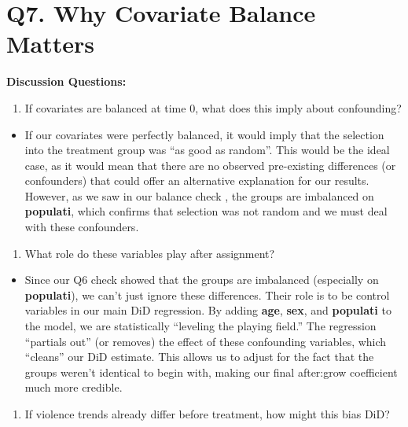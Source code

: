 \documentclass[
]{article}
\providecommand{\tightlist}{%
  \setlength{\itemsep}{0pt}\setlength{\parskip}{0pt}}
\begin{document}
\section{Q7. Why Covariate Balance
Matters}\label{q7.-why-covariate-balance-matters}

\textbf{Discussion Questions:}

\begin{enumerate}
\def\labelenumi{\arabic{enumi}.}
\tightlist
\item
  If covariates are balanced at time 0, what does this imply about
  confounding?
\end{enumerate}

\begin{itemize}
\tightlist
\item
  If our covariates were perfectly balanced, it would imply that the
  selection into the treatment group was ``as good as random''. This
  would be the ideal case, as it would mean that there are no observed
  pre-existing differences (or confounders) that could offer an
  alternative explanation for our results. However, as we saw in our
  balance check , the groups are imbalanced on \textbf{populati}, which
  confirms that selection was not random and we must deal with these
  confounders.
\end{itemize}

\begin{enumerate}
\def\labelenumi{\arabic{enumi}.}
\setcounter{enumi}{1}
\tightlist
\item
  What role do these variables play after assignment?
\end{enumerate}

\begin{itemize}
\tightlist
\item
  Since our Q6 check showed that the groups are imbalanced (especially
  on \textbf{populati}), we can't just ignore these differences. Their
  role is to be control variables in our main DiD regression. By adding
  \textbf{age}, \textbf{sex}, and \textbf{populati} to the model, we are
  statistically ``leveling the playing field.'' The regression
  ``partials out'' (or removes) the effect of these confounding
  variables, which ``cleans'' our DiD estimate. This allows us to adjust
  for the fact that the groups weren't identical to begin with, making
  our final after:grow coefficient much more credible.
\end{itemize}

\begin{enumerate}
\def\labelenumi{\arabic{enumi}.}
\setcounter{enumi}{2}
\tightlist
\item
  If violence trends already differ before treatment, how might this
  bias DiD?
\end{enumerate}
\end{document}
